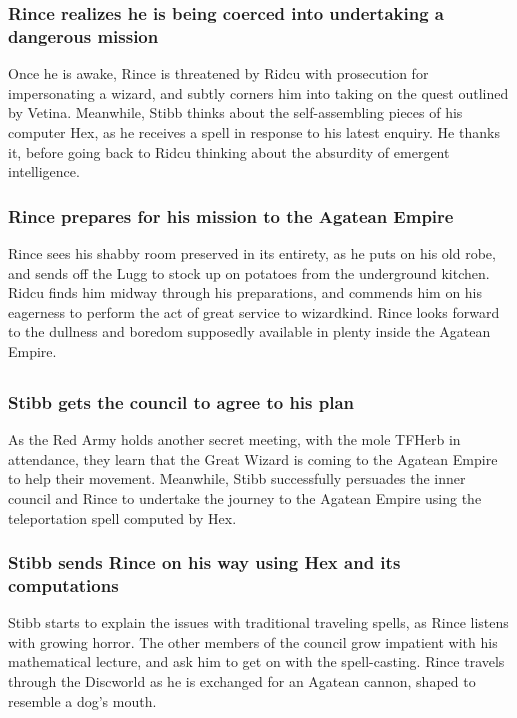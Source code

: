 \subsubsection{\Gls{Rince} realizes he is being coerced into undertaking a dangerous mission}
Once he is awake, \Gls{Rince} is threatened by \Gls{Ridcu} with prosecution for impersonating a
wizard, and subtly corners him into taking on the quest outlined by \Gls{Vetina}. Meanwhile,
\Gls{Stibb} thinks about the self-assembling pieces of his computer \Gls{Hex}, as he receives a
spell in response to his latest enquiry. He thanks it, before going back to \Gls{Ridcu} thinking
about the absurdity of emergent intelligence.

\subsubsection{\Gls{Rince} prepares for his mission to the Agatean Empire}
\Gls{Rince} sees his shabby room preserved in its entirety, as he puts on his old robe, and sends
off the \Gls{Lugg} to stock up on potatoes from the underground kitchen. \Gls{Ridcu} finds him
midway through his preparations, and commends him on his eagerness to perform the act of great
service to wizardkind. \Gls{Rince} looks forward to the dullness and boredom supposedly available
in plenty inside the Agatean Empire.

\subsection{}
\subsubsection{\Gls{Stibb} gets the council to agree to his plan}
As the Red Army holds another secret meeting, with the mole \Gls{TFHerb} in attendance, they learn
that the Great Wizard is coming to the Agatean Empire to help their movement. Meanwhile, \Gls{Stibb}
successfully persuades the inner council and \Gls{Rince} to undertake the journey to the Agatean
Empire using the teleportation spell computed by \Gls{Hex}.

\subsubsection{\Gls{Stibb} sends \Gls{Rince} on his way using \Gls{Hex} and its computations}
\Gls{Stibb} starts to explain the issues with traditional traveling spells, as \Gls{Rince} listens
with growing horror. The other members of the council grow impatient with his mathematical lecture,
and ask him to get on with the spell-casting. \Gls{Rince} travels through the Discworld as he is
exchanged for an Agatean cannon, shaped to resemble a dog's mouth.

